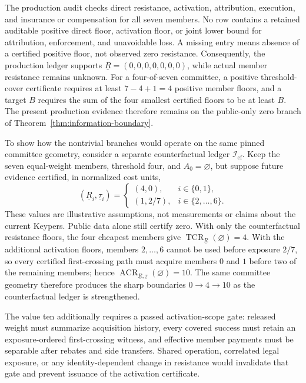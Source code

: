 The production audit checks direct resistance, activation, attribution,
execution, and insurance or compensation for all seven members. No row contains
a retained auditable positive direct floor, activation floor, or joint lower
bound for attribution, enforcement, and unavoidable loss. A missing entry
means absence of a certified positive floor, not observed zero resistance.
Consequently, the production ledger supports
\(\underline R=(0,0,0,0,0,0,0)\), while actual member resistance remains
unknown. For a four-of-seven committee, a positive threshold-cover certificate
requires at least \(7-4+1=4\) positive member floors, and a target \(B\)
requires the sum of the four smallest certified floors to be at least \(B\).
The present production evidence therefore remains on the public-only zero
branch of Theorem~\ref{thm:information-boundary}.

To show how the nontrivial branches would operate on the same pinned committee
geometry, consider a separate counterfactual ledger
\(\mathcal I_{\mathrm{cf}}\). Keep the seven equal-weight members, threshold
four, and \(A_0=\varnothing\), but suppose future evidence certified, in
normalized cost units,
\[
  (\underline R_i,\underline\tau_i)=
  \begin{cases}
     (4,0),   & i\in\{0,1\},\\
     (1,2/7), & i\in\{2,\ldots,6\}.
  \end{cases}
\]
These values are illustrative assumptions, not measurements or claims about
the current Keypers. Public data alone still certify zero. With only the
counterfactual resistance floors, the four cheapest members give
\(\operatorname{TCR}_{\underline R}(\varnothing)=4\). With the additional
activation floors, members \(2,\ldots,6\) cannot be used before exposure
\(2/7\), so every certified first-crossing path must acquire members \(0\) and
\(1\) before two of the remaining members; hence
\(\operatorname{ACR}_{\underline R,\underline\tau}(\varnothing)=10\).
The same committee geometry therefore produces the sharp boundaries
\(0\to4\to10\) as the counterfactual ledger is strengthened.

The value ten additionally requires a passed activation-scope gate: released
weight must summarize acquisition history, every covered success must retain
an exposure-ordered first-crossing witness, and effective member payments must
be separable after rebates and side transfers. Shared operation, correlated
legal exposure, or any identity-dependent change in resistance would invalidate
that gate and prevent issuance of the activation certificate.

